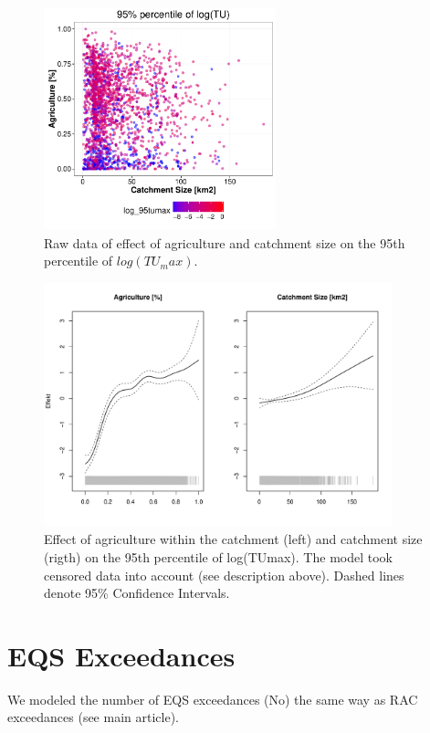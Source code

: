 \documentclass[pdftex,a4paper]{scrreprt}
\begin{document}
\begin{figure}[h]
	\centering
	\includegraphics[width = 0.6\textwidth]{ezgagritu}
	\caption{Raw data of effect of agriculture and catchment size on the 95th percentile of $log(TU_max)$.}
	\label{fig:ezgagritu}
\end{figure}

\begin{figure}[h]
	\centering
	\includegraphics[width = 0.9\textwidth]{ezgagritumodel}
	\caption{Effect of agriculture within the catchment (left) and catchment size (rigth) on the 95th percentile of log(TUmax). The model took censored data into account (see description above). Dashed lines denote 95\% Confidence Intervals.}
	\label{fig:ezgagritumodel}
\end{figure}


\pagebreak
\section{EQS Exceedances}
We modeled the number of EQS exceedances (No) the same way as RAC exceedances (see main article).
\end{document}
